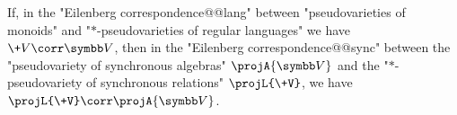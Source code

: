 \begin{theorem}
	\AP\label{thm:lifting-theorem-monoids-pseudovarieties}
	If, in the "Eilenberg correspondence@@lang"
	between "pseudovarieties of mon\-oids" and "$\ast$-pseudovarieties of regular languages"
	we have~$\+V \corr \B{V}$,
	then in the "Eilenberg correspondence@@sync"
	between the "pseudovariety of synchronous algebras" $\projA{\B{V}}$ and
	the "$\ast$-pseudovariety of synchronous relations" $\projL{\+V}$,
	we have~$\projL{\+V} \corr \projA{\B{V}}$.
\end{theorem}